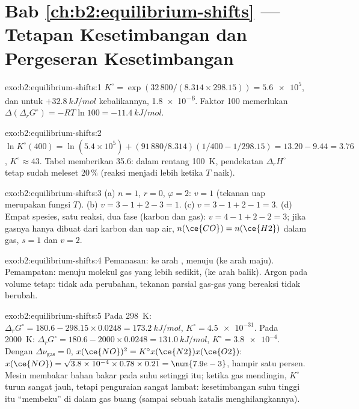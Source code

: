 \section*{Bab \ref{ch:b2:equilibrium-shifts} --- Tetapan Kesetimbangan dan Pergeseran Kesetimbangan}

\begin{solution}{exo:b2:equilibrium-shifts:1}
$K^\circ = \exp(32\,800/(8.314 \times 298.15)) = \num{5.6e5}$, dan untuk
$+\qty{32.8}{kJ/mol}$ kebalikannya, \num{1.8e-6}. Faktor 100 memerlukan
$\Delta(\Delta_r G^\circ) = -RT\ln 100 = \qty{-11.4}{kJ/mol}$.
\end{solution}

\begin{solution}{exo:b2:equilibrium-shifts:2}
$\ln K^\circ(400) = \ln(5.4 \times 10^5) + (91\,880/8.314)(1/400 -
1/298.15) = 13.20 - 9.44 = 3.76$, $K^\circ \approx 43$. Tabel memberikan
35.6: dalam rentang \qty{100}{K}, pendekatan $\Delta_r H^\circ$ tetap sudah
meleset 20\,\% (reaksi menjadi lebih  ketika $T$ naik).
\end{solution}

\begin{solution}{exo:b2:equilibrium-shifts:3}
(a) $n = 1$, $r = 0$, $\varphi = 2$: $v = 1$ (tekanan uap merupakan fungsi
$T$). (b) $v = 3 - 1 + 2 - 3 = 1$. (c) $v = 3 - 1 + 2 - 1 = 3$. (d) Empat
spesies, satu reaksi, dua fase (karbon dan gas): $v = 4 - 1 + 2 - 2 =
3$; jika gasnya hanya dibuat dari karbon dan uap air, $n(\ce{CO}) = n(\ce{H2})$
dalam gas, $s = 1$ dan $v = 2$.
\end{solution}

\begin{solution}{exo:b2:equilibrium-shifts:4}
Pemanasan: ke arah , menuju  (ke arah maju). Pemampatan:
menuju molekul gas yang lebih sedikit,  (ke arah balik). Argon
pada volume tetap: tidak ada perubahan, tekanan parsial gas-gas yang
bereaksi tidak berubah.
\end{solution}

\begin{solution}{exo:b2:equilibrium-shifts:5}
Pada \qty{298}{K}: $\Delta_r G^\circ = 180.6 - 298.15 \times 0.0248 =
\qty{173.2}{kJ/mol}$, $K^\circ = \num{4.5e-31}$. Pada \qty{2000}{K}: $\Delta_r
G^\circ = 180.6 - 2000 \times 0.0248 = \qty{131.0}{kJ/mol}$, $K^\circ =
\num{3.8e-4}$. Dengan $\Delta\nu_{\text{gas}} = 0$, $x(\ce{NO})^2 = K^\circ x(\ce{N2})
x(\ce{O2})$: $x(\ce{NO}) = \sqrt{3.8 \times 10^{-4} \times 0.78 \times 0.21} =
\num{7.9e-3}$, hampir satu persen. Mesin membakar bahan bakar pada suhu
setinggi itu; ketika gas mendingin, $K^\circ$ turun sangat jauh, tetapi
penguraian  sangat lambat: kesetimbangan suhu tinggi itu
``membeku'' di dalam gas buang (sampai sebuah katalis
menghilangkannya).
\end{solution}

